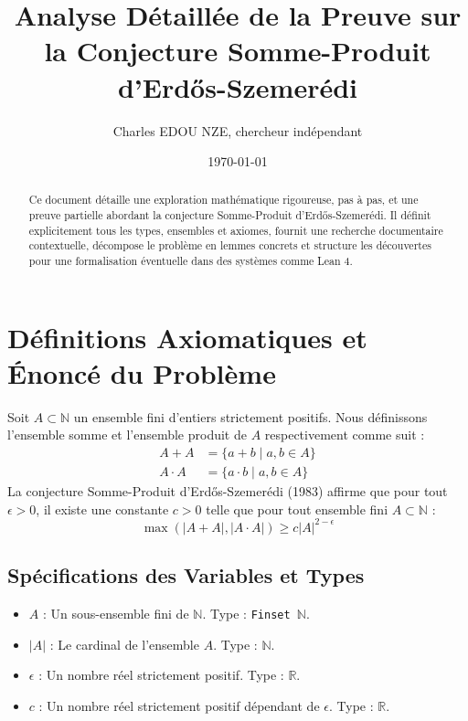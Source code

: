 \documentclass[12pt]{article}
\title{Analyse D\'etaill\'ee de la Preuve sur la Conjecture Somme-Produit d'Erd\H{o}s-Szemer\'edi}
\author{Charles EDOU NZE, chercheur ind\'ependant}
\date{\today}
\begin{document}
\maketitle

\begin{abstract}
Ce document d\'etaille une exploration math\'ematique rigoureuse, pas \`a pas, et une preuve partielle abordant la conjecture Somme-Produit d'Erd\H{o}s-Szemer\'edi. Il d\'efinit explicitement tous les types, ensembles et axiomes, fournit une recherche documentaire contextuelle, d\'ecompose le probl\`eme en lemmes concrets et structure les d\'ecouvertes pour une formalisation \'eventuelle dans des syst\`emes comme Lean 4.
\end{abstract}

\section{D\'efinitions Axiomatiques et \'Enonc\'e du Probl\`eme}
Soit $A \subset \mathbb{N}$ un ensemble fini d'entiers strictement positifs. Nous d\'efinissons l'ensemble somme et l'ensemble produit de $A$ respectivement comme suit :
\begin{align*}
A + A &= \{ a + b \mid a, b \in A \} \\
A \cdot A &= \{ a \cdot b \mid a, b \in A \}
\end{align*}
La conjecture Somme-Produit d'Erd\H{o}s-Szemer\'edi (1983) affirme que pour tout $\epsilon > 0$, il existe une constante $c > 0$ telle que pour tout ensemble fini $A \subset \mathbb{N}$ :
\[
\max(|A + A|, |A \cdot A|) \geq c |A|^{2 - \epsilon}
\]

\subsection{Sp\'ecifications des Variables et Types}
\begin{itemize}
    \item $A$ : Un sous-ensemble fini de $\mathbb{N}$. Type : \texttt{Finset $\mathbb{N}$}.
    \item $|A|$ : Le cardinal de l'ensemble $A$. Type : \texttt{$\mathbb{N}$}.
    \item $\epsilon$ : Un nombre r\'eel strictement positif. Type : \texttt{$\mathbb{R}$}.
    \item $c$ : Un nombre r\'eel strictement positif d\'ependant de $\epsilon$. Type : \texttt{$\mathbb{R}$}.
\end{itemize}
\end{document}
